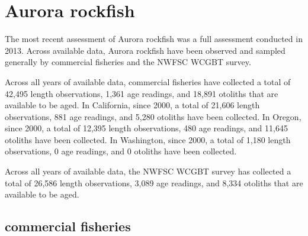 \documentclass[11pt,
  english,
  letterpaper,
]{article}
\begin{document}

\hypertarget{aurora-rockfish}{%
\section{Aurora rockfish}\label{aurora-rockfish}}

\leavevmode\tagmcend\tagstructend


The most recent assessment of Aurora rockfish was a full assessment conducted in 2013. Across available data, Aurora rockfish have been observed and sampled generally by commercial fisheries and the NWFSC WCGBT survey.

\leavevmode\tagmcend\tagstructend\par


Across all years of available data, commercial fisheries have collected a total of 42,495 length observations, 1,361 age readings, and 18,891 otoliths that are available to be aged. In California, since 2000, a total of 21,606 length observations, 881 age readings, and 5,280 otoliths have been collected. In Oregon, since 2000, a total of 12,395 length observations, 480 age readings, and 11,645 otoliths have been collected. In Washington, since 2000, a total of 1,180 length observations, 0 age readings, and 0 otoliths have been collected.

\leavevmode\tagmcend\tagstructend\par


Across all years of available data, the NWFSC WCGBT survey has collected a total of 26,586 length observations, 3,089 age readings, and 8,334 otoliths that are available to be aged.

\leavevmode\tagmcend\tagstructend\par


\hypertarget{commercial-fisheries-1}{%
\subsection{commercial fisheries}\label{commercial-fisheries-1}}

\leavevmode\tagmcend\tagstructend

\end{document}
